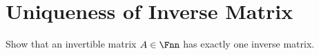 \section{Uniqueness of Inverse Matrix} 
 
 Show that an invertible matrix $A\in\Fnn$ has exactly one inverse matrix.
